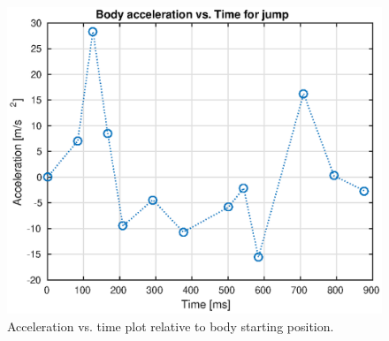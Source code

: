\begin{figure}
\centering
\includegraphics[width=1\textwidth]{images/experiments/jump/acceleration-vs-time.eps} 
\caption{Acceleration vs. time plot relative to body starting position.}
\label{fig:acc-time-jump}
\end{figure}

